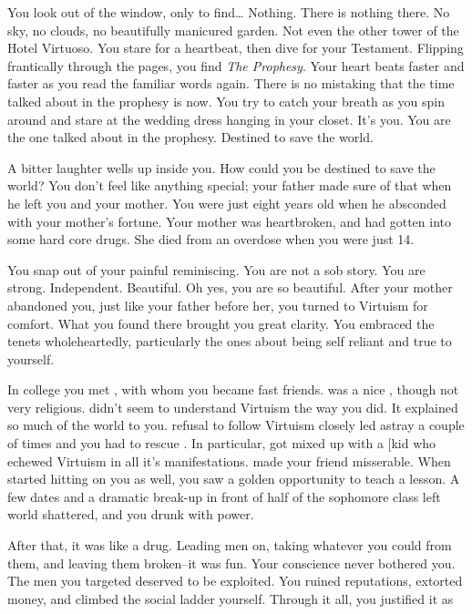 \documentclass[char]{guildcamp1}
\begin{document}
\name{\cBride{}}

You look out of the window, only to find{\ldots} Nothing. There is nothing there. No sky, no clouds, no beautifully manicured garden. Not even the other tower of the Hotel Virtuoso. You stare for a heartbeat, then dive for your Testament. Flipping frantically through the pages, you find {\em The Prophesy}. Your heart beats faster and faster as you read the familiar words again. There is no mistaking that the time talked about in the prophesy is now. You try to catch your breath as you spin around and stare at the wedding dress hanging in your closet. It's you. You are the one talked about in the prophesy. Destined to save the world.

A bitter laughter wells up inside you. How could you be destined to save the world? You don't feel like anything special; your father made sure of that when he left you and your mother. You were just eight years old when he absconded with your mother's fortune. Your mother was heartbroken, and had gotten into some hard core drugs. She died from an overdose when you were just 14.

You snap out of your painful reminiscing. You are not a sob story. You are strong. Independent. Beautiful. Oh yes, you are so beautiful. After your mother abandoned you, just like your father before her, you turned to Virtuism for comfort. What you found there brought you great clarity. You embraced the tenets wholeheartedly, particularly the ones about being self reliant and true to yourself.

In college you met \cRival{}, with whom you became fast friends.  was a nice , though not very religious.  didn't seem to understand Virtuism the way you did. It explained so much of the world to you.  refusal to follow Virtuism closely led \cRival{} astray a couple of times and you had to rescue . In particular,  got  mixed up with a \cRivalEx[{kid} who echewed Virtuism in all it's manifestations.  made your friend misserable. When  started hitting on you as well, you saw a golden opportunity to teach  a lesson. A few dates and a dramatic break-up in front of half of the sophomore class left  world shattered, and you drunk with power.

After that, it was like a drug. Leading men on, taking whatever you could from them, and leaving them broken--it was fun. Your conscience never bothered you. The men you targeted deserved to be exploited. You ruined reputations, extorted money, and climbed the social ladder yourself. Through it all, you justified it as 


\begin{contacts}
  \contact{\cGroomA{}} 
\end{contacts}
\end{document}
